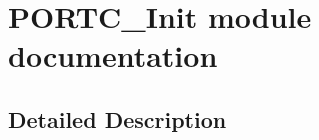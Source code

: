 \hypertarget{group___p_o_r_t_c___init__module}{}\section{P\+O\+R\+T\+C\+\_\+\+Init module documentation}
\label{group___p_o_r_t_c___init__module}


\subsection{Detailed Description}
